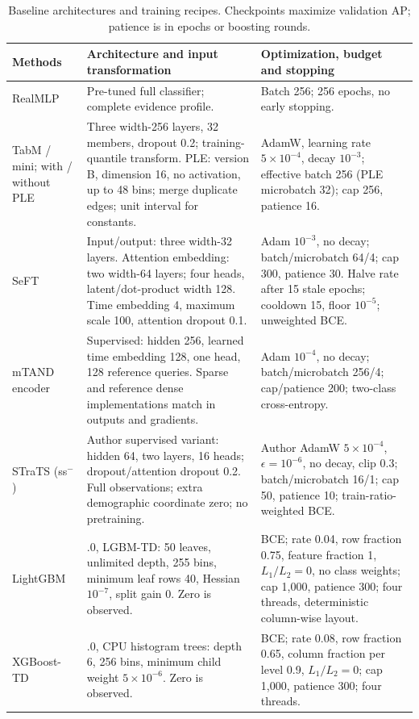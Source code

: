 \begin{table}[tp]
\centering\small
\setlength{\tabcolsep}{3pt}
\caption{Baseline architectures and training recipes. Checkpoints maximize validation AP; patience is in epochs or boosting rounds.}
\label{tab:lgbm-recipe}
\begin{tabular}{@{}>{\raggedright\arraybackslash}p{}>{\raggedright\arraybackslash}p{}>{\raggedright\arraybackslash}p{}@{}}
\toprule
Methods & Architecture and input transformation & Optimization, budget and stopping \\
\midrule
RealMLP & Pre-tuned full classifier; complete evidence profile. & Batch 256; 256 epochs, no early stopping. \\
TabM / mini; with / without PLE & Three width-256 layers, 32 members, dropout 0.2; training-quantile transform. PLE: version B, dimension 16, no activation, up to 48 bins; merge duplicate edges; unit interval for constants. & AdamW, learning rate $5\times10^{-4}$, decay $10^{-3}$; effective batch 256 (PLE microbatch 32); cap 256, patience 16. \\
SeFT & Input/output: three width-32 layers. Attention embedding: two width-64 layers; four heads, latent/dot-product width 128. Time embedding 4, maximum scale 100, attention dropout 0.1. & Adam $10^{-3}$, no decay; batch/microbatch 64/4; cap 300, patience 30. Halve rate after 15 stale epochs; cooldown 15, floor $10^{-5}$; unweighted BCE. \\
mTAND encoder & Supervised: hidden 256, learned time embedding 128, one head, 128 reference queries. Sparse and reference dense implementations match in outputs and gradients. & Adam $10^{-4}$, no decay; batch/microbatch 256/4; cap/patience 200; two-class cross-entropy. \\
STraTS (ss$^{-}$) & Author supervised variant: hidden 64, two layers, 16 heads; dropout/attention dropout 0.2. Full observations; extra demographic coordinate zero; no pretraining. & Author AdamW $5\times10^{-4}$, $\epsilon=10^{-6}$, no decay, clip 0.3; batch/microbatch 16/1; cap 50, patience 10; train-ratio-weighted BCE. \\
LightGBM & 4.6.0, LGBM-TD: 50 leaves, unlimited depth, 255 bins, minimum leaf rows 40, Hessian $10^{-7}$, split gain 0. Zero is observed. & BCE; rate 0.04, row fraction 0.75, feature fraction 1, $L_1/L_2=0$, no class weights; cap 1,000, patience 300; four threads, deterministic column-wise layout. \\
XGBoost-TD & 3.2.0, CPU histogram trees: depth 6, 256 bins, minimum child weight $5\times10^{-6}$. Zero is observed. & BCE; rate 0.08, row fraction 0.65, column fraction per level 0.9, $L_1/L_2=0$; cap 1,000, patience 300; four threads. \\
\bottomrule
\end{tabular}
\end{table}
